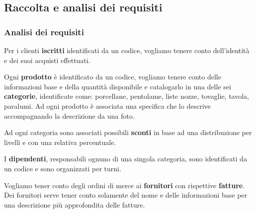 \subsection{Raccolta e analisi dei requisiti}

\subsubsection{Analisi dei requisiti}
Per i clienti \textbf{iscritti} identificati da un codice, vogliamo tenere conto dell'identit\`a e dei suoi acquisti effettuati.



Ogni \textbf{prodotto} \`e identificato da un codice, vogliamo tenere conto delle informazioni base e della quantit\`a disponibile e catalogarlo in una delle sei \textbf{categorie}, identificate come: porcellane, pentolame, liste nozze, tovaglie, tavola, paralumi. Ad ogni prodotto \`e associata una specifica che lo descrive accompagnando la descrizione da una foto.


Ad ogni categoria sono associati possibili \textbf{sconti} in base ad una distribuzione per livelli e con una relativa percentuale.


I \textbf{dipendenti}, responsabili ognuno di una singola categoria, sono identificati da un codice e sono organizzati per turni.


Vogliamo tener conto degli ordini di merce ai \textbf{fornitori} con rispettive \textbf{fatture}. Dei fornitori serve tener conto solamente del nome e delle informazioni base per una descrizione pi\`u approfondita delle fatture.  \\


